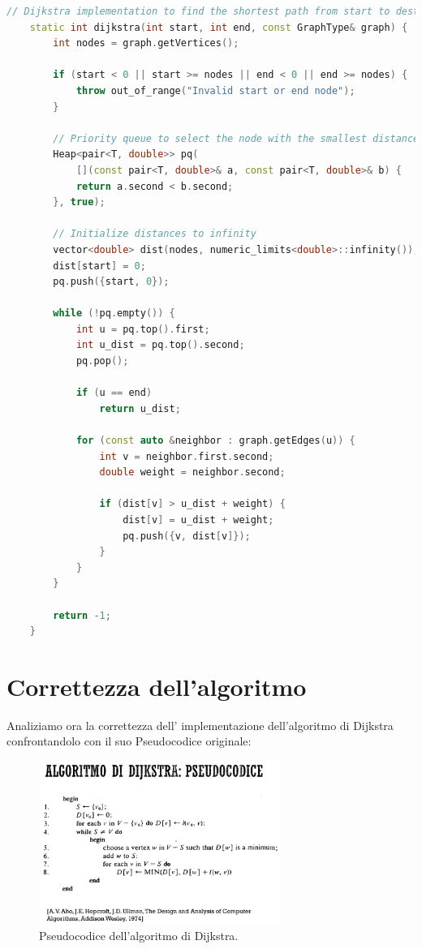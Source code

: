 \documentclass[a4paper,12pt]{article}
\begin{document}
\begin{lstlisting}[language=c++, label=Dijkstra]
    // Dijkstra implementation to find the shortest path from start to destination
    static int dijkstra(int start, int end, const GraphType& graph) {
        int nodes = graph.getVertices();

        if (start < 0 || start >= nodes || end < 0 || end >= nodes) {
            throw out_of_range("Invalid start or end node");
        }

        // Priority queue to select the node with the smallest distance
        Heap<pair<T, double>> pq(
            [](const pair<T, double>& a, const pair<T, double>& b) {
            return a.second < b.second;
        }, true);

        // Initialize distances to infinity
        vector<double> dist(nodes, numeric_limits<double>::infinity());
        dist[start] = 0;
        pq.push({start, 0});

        while (!pq.empty()) {
            int u = pq.top().first; 
            int u_dist = pq.top().second;
            pq.pop();

            if (u == end)
                return u_dist;

            for (const auto &neighbor : graph.getEdges(u)) {
                int v = neighbor.first.second;
                double weight = neighbor.second;

                if (dist[v] > u_dist + weight) {
                    dist[v] = u_dist + weight;
                    pq.push({v, dist[v]});
                }
            }
        }

        return -1;
    }


\end{lstlisting}

\clearpage

\section{Correttezza dell'algoritmo}

Analiziamo ora la correttezza dell' implementazione dell'algoritmo di Dijkstra 
confrontandolo con il suo Pseudocodice originale: 

\begin{figure}[h!]
    \centering
    \includegraphics[width=0.7\textwidth]{Images/DijkstraPseudoCode.png}
    \caption{Pseudocodice dell'algoritmo di Dijkstra.}\label{fig:Pseudocodice Dijkstra}
\end{figure}
\end{document}
